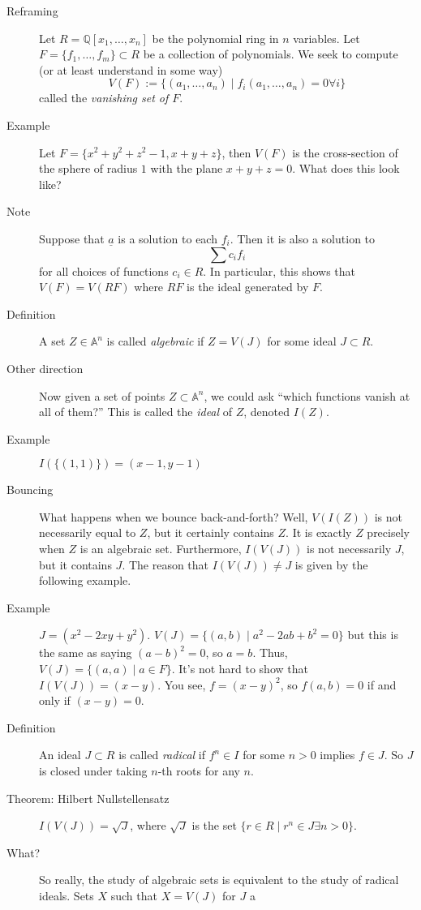 \documentclass[12pt]{article}
\newcommand{\bbA}{\mathbb{A}}
\newcommand{\bbQ}{\mathbb{Q}}
\begin{document}
\begin{description}
\item[Reframing] Let $R=\bbQ[x_1,\dotsc, x_n]$ be the polynomial ring
  in $n$ variables. Let $F=\{f_1,\dotsc, f_m\} \subset R$ be a collection of
  polynomials. We seek to compute (or at least understand in some way) 
  \[V(F) := \{(a_1,\dotsc, a_n) \mid f_i(a_1,\dotsc, a_n)=0 \forall
    i\}\] called the \emph{vanishing set of $F$}. 
\item[Example] Let $F=\{x^2+y^2+z^2-1, x+y+z\}$, then $V(F)$ is the
  cross-section of the sphere of radius $1$ with the plane
  $x+y+z=0$. What does this look like? 
\item[Note] Suppose that $\underline{a}$ is a solution to each
  $f_i$. Then it is also a solution to 
  \[\sum c_i f_i\] for all choices of functions $c_i \in R$. In
  particular, this shows that $V(F) = V( RF)$ where $RF$ is the ideal
  generated by $F$. 
\item[Definition] A set $Z\in \bbA^n$ is called \emph{algebraic} if
  $Z=V(J)$ for some ideal $J\subset R$.  
\item[Other direction] Now given a set of points $Z\subset \bbA^n$, we
  could ask ``which functions vanish at all of them?'' This is called
  the \emph{ideal} of $Z$, denoted $I(Z)$. 
\item[Example] $I(\{(1,1)\}) = (x-1,y-1)$
\item[Bouncing] What happens when we bounce back-and-forth? Well,
  $V(I(Z))$ is not necessarily equal to $Z$, but it certainly contains
  $Z$. It is exactly $Z$ precisely when $Z$ is an algebraic set. Furthermore, $I(V(J))$ is not necessarily $J$, but it contains
  $J$. The reason that $I(V(J))\neq J$ is given by the following
  example.
\item[Example] $J=(x^2-2xy+y^2)$. $V(J) = \{(a,b) \mid
  a^2-2ab+b^2=0\}$ but this is the same as saying $(a-b)^2=0$, so
  $a=b$. Thus, $V(J) = \{(a,a) \mid a\in F\}$. It's not hard to show
  that $I(V(J))=(x-y)$. You see, $f=(x-y)^2$, so $f(a,b)=0$ if and
  only if $(x-y)=0$. 
\item[Definition] An ideal $J\subset R$ is called \emph{radical} if
  $f^n \in I$ for some $n>0$ implies $f\in J$. So $J$ is closed under
  taking $n$-th roots for any $n$. 
\item[Theorem: Hilbert Nullstellensatz] $I(V(J))=\sqrt{J}$, where
  $\sqrt{J}$ is the set $\{r\in R \mid r^n \in J \exists n>0\}$. 
\item[What?] So really, the study of algebraic sets is equivalent to
  the study of radical ideals. Sets $X$ such that $X=V(J)$ for $J$ a

\end{description}
\end{document}
